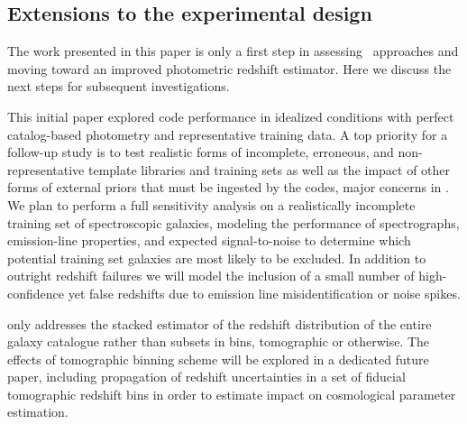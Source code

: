 \subsection{Extensions to the experimental design}


The work presented in this paper is only a first step in assessing \pzpdf\ approaches and moving toward an improved photometric redshift estimator.
Here we discuss the next steps for subsequent investigations.

This initial paper explored code performance in idealized conditions with perfect catalog-based photometry and representative training data.
A top priority for a follow-up study is to test realistic forms of incomplete, erroneous, and non-representative template libraries and training sets as well as the impact of other forms of external priors that must be ingested by the codes, major concerns in \citet{Newman:2015, Masters:2017}.
We plan to perform a full sensitivity analysis on a realistically incomplete training set of spectroscopic galaxies, modeling the performance of spectrographs, emission-line properties, and expected signal-to-noise to determine which potential training set galaxies are most likely to be excluded.
In addition to outright redshift failures we will model the inclusion of a small number of high-confidence yet false redshifts due to emission line misidentification or noise spikes.

 only addresses the stacked estimator of the redshift distribution of the entire galaxy catalogue rather than subsets in bins, tomographic or otherwise.
The effects of tomographic binning scheme will be explored in a dedicated future paper, including propagation of redshift uncertainties in a set of fiducial tomographic redshift bins in order to estimate impact on cosmological parameter estimation.


